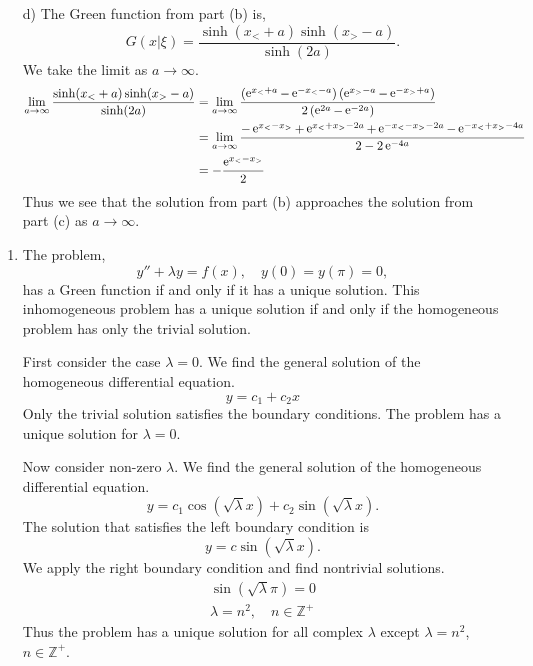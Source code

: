 {\begin{Solution}
\begin{itemize}
\[    = -2.
    \]
    The Green function is
    \[
    G(x|\xi) = \frac{ \e^{x_<} \e^{- x_>} }{ -2 },
    \]
    \[
    \boxed{
      G(x|\xi) = - \frac{1}{2} \e^{x_< - x_>}.
      }
    \]
  \item[d)]
    The Green function from part (b) is,
    \[
    G(x|\xi) = \frac{ \sinh(x_< + a) \sinh(x_> - a) }{ \sinh(2 a) }.
    \]
    We take the limit as $a \to \infty$.
    \begin{align*}
      \lim_{a \to \infty} \frac{ \sinh(x_< + a) \sinh(x_> - a) }{ \sinh(2 a) }
      &= \lim_{a \to \infty} \frac{ 
        \left( \mathop{\mathrm{e}}\nolimits^{x_< + a} - \mathop{\mathrm{e}}\nolimits^{-x_< - a} \right)
        \left( \mathop{\mathrm{e}}\nolimits^{x_> - a} - \mathop{\mathrm{e}}\nolimits^{-x_> + a} \right) }
      { 2 \left( \mathop{\mathrm{e}}\nolimits^{2 a} - \mathop{\mathrm{e}}\nolimits^{-2 a} \right) } \\
      &= \lim_{a \to \infty} \frac{ -\mathop{\mathrm{e}}\nolimits^{x_< - x_>} + \mathop{\mathrm{e}}\nolimits^{x_< + x_> - 2a} 
        + \mathop{\mathrm{e}}\nolimits^{-x_< - x_> - 2 a} - \mathop{\mathrm{e}}\nolimits^{-x_< + x_> - 4a } }
      { 2 - 2 \mathop{\mathrm{e}}\nolimits^{-4 a} } \\
      &= - \frac{ \mathop{\mathrm{e}}\nolimits^{x_< - x_>} }{ 2 }
    \end{align*}
    Thus we see that the solution from part (b) approaches the solution from 
    part (c) as $a \to \infty$.
  \end{itemize}
\end{Solution}











\begin{Solution}
  \label{solution y+lambday=f}
  \begin{enumerate}
  \item
    The problem,
    \[
    y'' + \lambda y = f(x), \quad y(0) = y(\pi) = 0,
    \]
    has a Green function if and only if it has a unique solution.  This 
    inhomogeneous problem has a unique solution if and only if the homogeneous
    problem has only the trivial solution.

    First consider the case $\lambda = 0$.  We find the general solution of the 
    homogeneous differential equation.
    \[
    y = c_1 + c_2 x
    \]
    Only the trivial solution satisfies the boundary conditions.  The problem
    has a unique solution for $\lambda = 0$.

    Now consider non-zero $\lambda$.  We find the general solution of the 
    homogeneous differential equation.
    \[
    y = c_1 \cos \left( \sqrt{\lambda} x \right)
    + c_2 \sin \left( \sqrt{\lambda} x \right).
    \]
    The solution that satisfies the left boundary condition is
    \[
    y = c \sin \left( \sqrt{\lambda} x \right).
    \]
    We apply the right boundary condition and find nontrivial solutions.
    \begin{gather*}
      \sin \left( \sqrt{\lambda} \pi \right) = 0
      \\
      \lambda = n^2, \quad n \in \mathbb{Z}^+
    \end{gather*}
    Thus the problem has a unique solution for all complex $\lambda$ except
    $\lambda = n^2$, $n \in \mathbb{Z}^+$.


\end{enumerate}
\end{Solution}}
